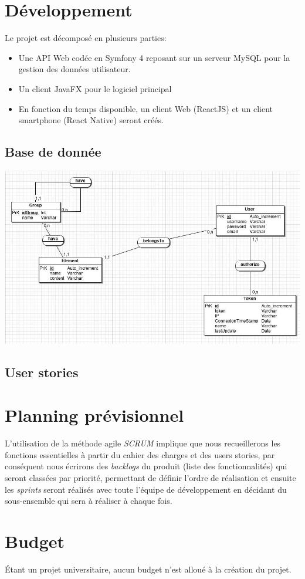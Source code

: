 \documentclass[oneside]{report}
\begin{document}
	\chapter{Développement}
	\par Le projet est décomposé en plusieurs parties:
	\begin{itemize}
		\item \par Une API Web codée en Symfony 4 reposant sur un serveur MySQL pour la gestion des données utilisateur.\\
		\item \par Un client JavaFX pour le logiciel principal\\
		\item \par En fonction du temps disponible, un client Web (ReactJS) et un client smartphone (React Native) seront créés. 
	\end{itemize}
	\section{Base de donnée}
	\includegraphics[scale=2]{mcd}

	\section{User stories}

	\chapter{Planning prévisionnel}
	\par L'utilisation de la méthode agile \textit{SCRUM} implique que nous recueillerons les fonctions essentielles à partir du cahier des charges et des users stories, par conséquent nous écrirons des \textit{backlogs} du produit (liste des fonctionnalités) qui seront classées par priorité, permettant de définir l'ordre de réalisation et ensuite les \textit{sprints} seront réalisés avec toute l'équipe de développement en décidant du sous-ensemble qui sera à réaliser à chaque fois.

	\chapter{Budget}
	\par Étant un projet universitaire, aucun budget n'est alloué à la création du projet.
\end{document}
